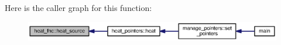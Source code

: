 Here is the caller graph for this function\+:\nopagebreak
\begin{figure}[H]
\begin{center}
\leavevmode
\includegraphics[width=350pt]{namespaceheat__fnc_aa028ca3e4b6d819e67f85b5b4fe49ea4_icgraph}
\end{center}
\end{figure}


